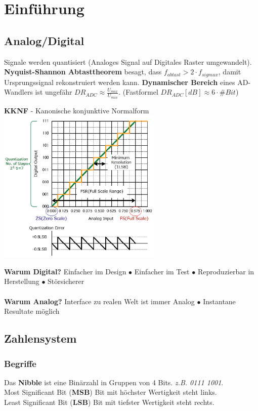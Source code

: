 \section{Einführung}
\subsection{Analog/Digital}
Signale werden quantisiert (Analoges Signal auf Digitales Raster umgewandelt).\\
\noindent\textbf{Nyquist-Shannon Abtasttheorem} besagt, dass $f_{abtast} > 2 \cdot f_{sigmax}$, damit Ursprungssignal rekonstruiert werden kann. \textbf{Dynamischer Bereich} eines AD-Wandlers ist ungefähr $DR_{ADC} \approx \frac{U_{max}}{U_{min}}$. (Fastformel $DR_{ADC}[dB] \approx 6 \cdot \#Bit$)

\begin{minipage}{\textwidth}
	\noindent\textbf{KKNF} - Kanonische konjunktive Normalform\\
	\includegraphics[height=20em]{./Images/ADC.jpg}
\end{minipage}


\noindent\textbf{Warum Digital?} 
Einfacher im Design $\bullet$ Einfacher im Test $\bullet$  Reproduzierbar in Herstellung  $\bullet$ Störsicherer
\\ \\
\noindent\textbf{Warum Analog?}
Interface zu realen Welt ist immer Analog $\bullet$ Instantane Resultate möglich

\subsection{Zahlensystem}
\subsubsection{Begriffe}
Das \textbf{Nibble} ist eine Binärzahl in Gruppen von 4 Bits. \textit{z.B. 0111 1001}. \\
\noindent
Most Significant Bit (\textbf{MSB}) Bit mit höchster Wertigkeit steht links. \\
\noindent
Least Significant Bit (\textbf{LSB}) Bit mit tiefster Wertigkeit steht rechts.


